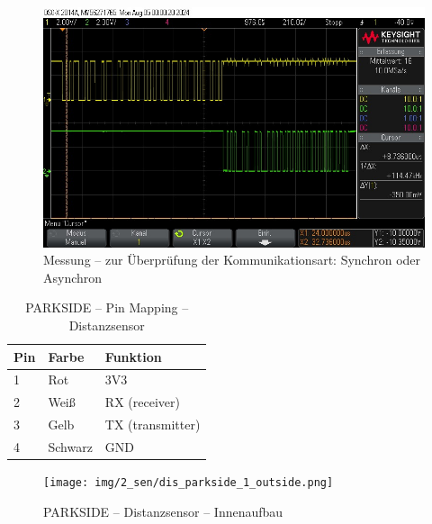 \pagebreak[1]
\begin{figure}[ht]
	\begin{center}
		\includegraphics[width=\textwidth]{img/2_sen/ozi_3.png}
		\caption{Messung – zur Überprüfung der Kommunikationsart: Synchron oder Asynchron}
		\label{parkside:ozi:datenübertragung}
	\end{center}
\end{figure}
\pagebreak[1]




\pagebreak[1]
\begin{table}[!ht]
	\centering
	\caption{PARKSIDE – Pin Mapping – Distanzsensor}
	\label{parkside:pinmapping}
	\begin{tabular}{l|ll}
		\hline
		\textbf{Pin} & \textbf{Farbe} & \textbf{Funktion} \\ \hline
		1            & Rot            & 3V3               \\
		2            & Weiß           & RX (receiver)     \\
		3            & Gelb           & TX (transmitter)  \\
		4            & Schwarz        & GND               \\ \hline
	\end{tabular}
\end{table}
\pagebreak[1]

\pagebreak[1]
\begin{figure}[!ht]
	\begin{center}
		\texttt{[image: img/2\_sen/dis\_parkside\_1\_outside.png]}
		\caption{PARKSIDE – Distanzsensor – Innenaufbau}
		\label{img_2_2:sen_dis_parkside:1}
	\end{center}
\end{figure}
\pagebreak[4]


